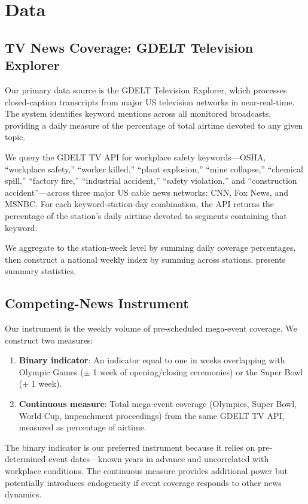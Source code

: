 \documentclass[12pt]{article}
\begin{document}
\section{Data}\label{sec:data}

\subsection{TV News Coverage: GDELT Television Explorer}

Our primary data source is the GDELT Television Explorer, which processes closed-caption transcripts from major US television networks in near-real-time. The system identifies keyword mentions across all monitored broadcasts, providing a daily measure of the percentage of total airtime devoted to any given topic.

We query the GDELT TV API for workplace safety keywords---OSHA, ``workplace safety,'' ``worker killed,'' ``plant explosion,'' ``mine collapse,'' ``chemical spill,'' ``factory fire,'' ``industrial accident,'' ``safety violation,'' and ``construction accident''---across three major US cable news networks: CNN, Fox News, and MSNBC. For each keyword-station-day combination, the API returns the percentage of the station's daily airtime devoted to segments containing that keyword.

We aggregate to the station-week level by summing daily coverage percentages, then construct a national weekly index by summing across stations.  presents summary statistics.

\subsection{Competing-News Instrument}

Our instrument is the weekly volume of pre-scheduled mega-event coverage. We construct two measures:

\begin{enumerate}
\item \textbf{Binary indicator}: An indicator equal to one in weeks overlapping with Olympic Games ($\pm$ 1 week of opening/closing ceremonies) or the Super Bowl ($\pm$ 1 week).
\item \textbf{Continuous measure}: Total mega-event coverage (Olympics, Super Bowl, World Cup, impeachment proceedings) from the same GDELT TV API, measured as percentage of airtime.
\end{enumerate}

The binary indicator is our preferred instrument because it relies on pre-determined event dates---known years in advance and uncorrelated with workplace conditions. The continuous measure provides additional power but potentially introduces endogeneity if event coverage responds to other news dynamics.
\end{document}
